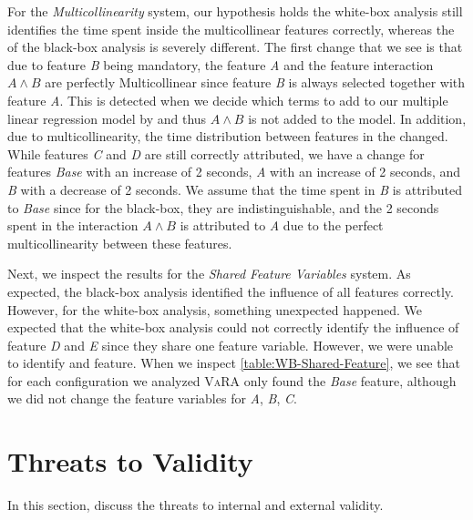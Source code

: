 For the \emph{Multicollinearity} system, our hypothesis holds the white-box analysis still identifies the time spent inside the multicollinear features correctly, whereas the {\perfInfluenceModel} of the black-box analysis is severely different. The first change that we see is that due to feature \emph{B} being mandatory, the feature \emph{A} and the feature interaction $A \land B$ are perfectly Multicollinear since feature \emph{B} 
is always selected together with feature \emph{A}. 
This is detected when we decide which terms to add to our multiple linear regression model by  
and thus $A \land B$ is not added to the model. In addition, due to multicollinearity, the time distribution between features in the 
{\perfInfluenceModel} changed. While features \emph{C} and \emph{D} are still correctly attributed, 
we have a change for features \emph{Base} with an increase of 2 seconds, \emph{A} with an increase of 2 seconds, 
and \emph{B} with a decrease of 2 seconds. We assume that the time spent in \emph{B} is attributed to \emph{Base} since for the black-box, 
they are indistinguishable, and the 2 seconds spent in the interaction $A \land B$ is attributed to \emph{A} due to the perfect multicollinearity 
between these features.

Next, we inspect the results for the \emph{Shared Feature Variables} system. 
As expected, the black-box analysis identified the influence of all features correctly. 
However, for the white-box analysis, something unexpected happened. 
We expected that the white-box analysis could not correctly identify the influence of feature \emph{D} and \emph{E} since they share one 
feature variable. However, we were unable to identify and feature. When we inspect \autoref{table:WB-Shared-Feature}, 
we see that for each configuration we analyzed \textsc{VaRA} only found the \emph{Base} feature, 
although we did not change the feature variables for \emph{A}, \emph{B}, \emph{C}.

\section{Threats to Validity}\label{sec:threats}

In this section, discuss the threats to internal and external validity.
